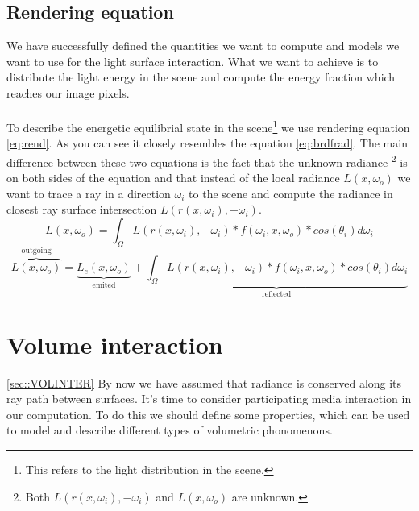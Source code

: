 \subsection{Rendering equation}
We have successfully defined the quantities we want to compute and models we want to use for the light surface interaction. What we want to achieve is to distribute the light energy in the scene and compute the energy fraction which reaches our image pixels.
\\
\\
To describe the energetic equilibrial state in the scene\footnote{This refers to the light distribution in the scene.} we use rendering equation \ref{eq:rend}. As you can see it closely resembles the equation \ref{eq:brdfrad}. The main difference between these two equations is the fact that the unknown radiance \footnote{Both $L(r(x,\omega_i),-\omega_{i})$ and $L(x,\omega_{o})$ are unknown.} is on both sides of the equation and that instead of the local radiance $L(x,\omega_{o})$ we want to trace a ray in a direction $\omega_{i}$ to the scene and compute the radiance in closest ray surface intersection $L(r(x,\omega_i),-\omega_{i})$.
\begin{equation}
L(x,\omega_{o})=\int_{\Omega}L(r(x,\omega_i),-\omega_{i})*f(\omega_{i},x,\omega_{o})*cos(\theta_{i})d\omega_{i}
\label{eq:rend}
\end{equation}
\begin{equation}
\overbrace{L(x,\omega_{o})}^\text{outgoing}=\underbrace{L_{e}(x,\omega_{o})}_\text{emited}+\underbrace{\int_{\Omega}L(r(x,\omega_i),-\omega_{i})*f(\omega_{i},x,\omega_{o})*cos(\theta_{i})d\omega_{i}}_\text{reflected}
\label{eq:rendem}
\end{equation}

\section{Volume interaction}
\ref{sec::VOLINTER}
By now we have assumed that radiance is conserved along its ray path between surfaces. It's time to consider participating media interaction in our computation. To do this we should define some properties, which can be used to model and describe different types of volumetric phonomenons.

